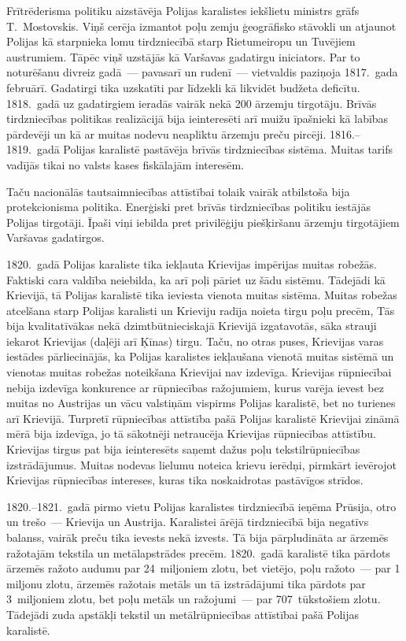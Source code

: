 \documentclass[twoside,a5paper,12pt,fleqn,openany]{extbook}
\begin{document}
Frītrēderisma politiku aizstāvēja Polijas karalistes iekšlietu ministrs grāfs T.~Mostovskis. Viņš cerēja izmantot poļu zemju ģeogrāfisko stāvokli un atjaunot Polijas kā starpnieka lomu tirdzniecībā starp Rietumeiropu un Tuvējiem austrumiem. Tāpēc viņš uzstājās kā Varšavas gadatirgu iniciators. Par to noturēšanu divreiz gadā~--- pavasarī un rudenī~--- vietvaldis paziņoja 1817.~gada februārī. Gadatirgi tika uzskatīti par līdzekli kā likvidēt budžeta deficītu. 1818.~gadā uz gadatirgiem ieradās vairāk nekā 200 ārzemju tirgotāju. Brīvās tirdzniecības politikas realizācijā bija ieinteresēti arī muižu īpašnieki kā labības pārdevēji un kā ar muitas nodevu neapliktu ārzemju preču pircēji. 1816.--1819.~gadā Polijas karalistē pastāvēja brīvās tirdzniecības sistēma. Muitas tarifs vadījās tikai no valsts kases fiskālajām interesēm.

Taču nacionālās tautsaimniecības attīstībai tolaik vairāk atbilstoša bija protekcionisma politika. Enerģiski pret brīvās tirdzniecības politiku iestājās Polijas tirgotāji. Īpaši viņi iebilda pret privilēģiju piešķiršanu ārzemju tirgotājiem Varšavas gadatirgos.

1820.~gadā Polijas karaliste tika iekļauta Krievijas impērijas muitas robežās. Faktiski cara valdība neiebilda, ka arī poļi pāriet uz šādu sistēmu. Tādejādi kā Krievijā, tā Polijas karalistē tika ieviesta vienota muitas sistēma. Muitas robežas atcelšana starp Polijas karalisti un Krieviju radīja noieta tirgu poļu precēm, Tās bija kvalitatīvākas nekā dzimtbūtnieciskajā Krievijā izgatavotās, sāka strauji iekarot Krievijas (daļēji arī Ķīnas) tirgu. Taču, no otras puses, Krievijas varas iestādes pārliecinājās, ka Polijas karalistes iekļaušana vienotā muitas sistēmā un vienotas muitas robežas noteikšana Krievijai nav izdevīga. Krievijas rūpniecībai nebija izdevīga konkurence ar rūpniecības ražojumiem, kurus varēja ievest bez muitas no Austrijas un vācu valstiņām vispirms Polijas karalistē, bet no turienes arī Krievijā. Turpretī rūpniecības attīstība pašā Polijas karalistē Krievijai zināmā mērā bija izdevīga, jo tā sākotnēji netraucēja Krievijas rūpniecības attīstību. Krievijas tirgus pat bija ieinteresēts saņemt dažus poļu tekstilrūpniecības izstrādājumus. Muitas nodevas lielumu noteica krievu ierēdņi, pirmkārt ievērojot Krievijas rūpniecības intereses, kuras tika noskaidrotas pastāvīgos strīdos.

1820.--1821.~gadā pirmo vietu Polijas karalistes tirdzniecībā ieņēma Prūsija, otro un trešo~--- Krievija un Austrija. Karalistei ārējā tirdzniecībā bija negatīvs balanss, vairāk preču tika ievests nekā izvests. Tā bija pārpludināta ar ārzemēs ražotajām tekstila un metālapstrādes precēm. 1820.~gadā karalistē tika pārdots ārzemēs ražoto audumu par 24~miljoniem zlotu, bet vietējo, poļu ražoto~--- par 1 miljonu zlotu, ārzemēs ražotais metāls un tā izstrādājumi tika pārdots par 3~miljoniem zlotu, bet poļu metāls un ražojumi~--- par 707~tūkstošiem zlotu. Tādejādi zuda apstākļi tekstil un metālrūpniecības attīstībai pašā Polijas karalistē.
\end{document}
